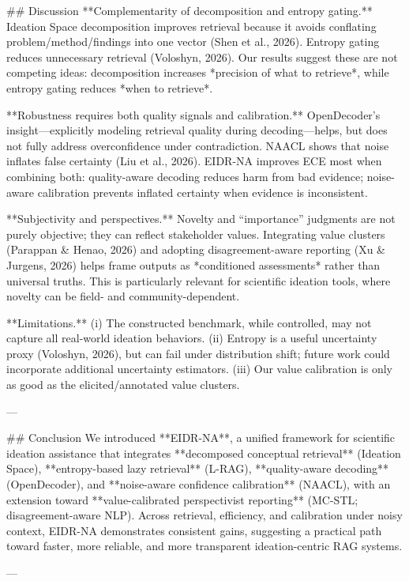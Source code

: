 ## Discussion  
**Complementarity of decomposition and entropy gating.** Ideation Space decomposition improves retrieval because it avoids conflating problem/method/findings into one vector (Shen et al., 2026). Entropy gating reduces unnecessary retrieval (Voloshyn, 2026). Our results suggest these are not competing ideas: decomposition increases *precision of what to retrieve*, while entropy gating reduces *when to retrieve*.

**Robustness requires both quality signals and calibration.** OpenDecoder’s insight—explicitly modeling retrieval quality during decoding—helps, but does not fully address overconfidence under contradiction. NAACL shows that noise inflates false certainty (Liu et al., 2026). EIDR-NA improves ECE most when combining both: quality-aware decoding reduces harm from bad evidence; noise-aware calibration prevents inflated certainty when evidence is inconsistent.

**Subjectivity and perspectives.** Novelty and “importance” judgments are not purely objective; they can reflect stakeholder values. Integrating value clusters (Parappan & Henao, 2026) and adopting disagreement-aware reporting (Xu & Jurgens, 2026) helps frame outputs as *conditioned assessments* rather than universal truths. This is particularly relevant for scientific ideation tools, where novelty can be field- and community-dependent.

**Limitations.** (i) The constructed benchmark, while controlled, may not capture all real-world ideation behaviors. (ii) Entropy is a useful uncertainty proxy (Voloshyn, 2026), but can fail under distribution shift; future work could incorporate additional uncertainty estimators. (iii) Our value calibration is only as good as the elicited/annotated value clusters.

---

## Conclusion  
We introduced **EIDR-NA**, a unified framework for scientific ideation assistance that integrates **decomposed conceptual retrieval** (Ideation Space), **entropy-based lazy retrieval** (L-RAG), **quality-aware decoding** (OpenDecoder), and **noise-aware confidence calibration** (NAACL), with an extension toward **value-calibrated perspectivist reporting** (MC-STL; disagreement-aware NLP). Across retrieval, efficiency, and calibration under noisy context, EIDR-NA demonstrates consistent gains, suggesting a practical path toward faster, more reliable, and more transparent ideation-centric RAG systems.

---

